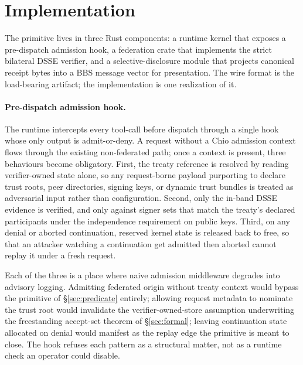 \section{Implementation}
\label{sec:implementation}

The primitive lives in three Rust components: a runtime kernel that exposes a pre-dispatch admission hook, a federation crate that implements the strict bilateral DSSE verifier, and a selective-disclosure module that projects canonical receipt bytes into a BBS message vector for presentation. The wire format is the load-bearing artifact; the implementation is one realization of it.

\paragraph{Pre-dispatch admission hook.} The runtime intercepts every tool-call before dispatch through a single hook whose only output is admit-or-deny. A request without a Chio admission context flows through the existing non-federated path; once a context is present, three behaviours become obligatory. First, the treaty reference is resolved by reading verifier-owned state alone, so any request-borne payload purporting to declare trust roots, peer directories, signing keys, or dynamic trust bundles is treated as adversarial input rather than configuration. Second, only the in-band DSSE evidence is verified, and only against signer sets that match the treaty's declared participants under the independence requirement on public keys. Third, on any denial or aborted continuation, reserved kernel state is released back to free, so that an attacker watching a continuation get admitted then aborted cannot replay it under a fresh request.

Each of the three is a place where naive admission middleware degrades into advisory logging. Admitting federated origin without treaty context would bypass the primitive of \S\ref{sec:predicate} entirely; allowing request metadata to nominate the trust root would invalidate the verifier-owned-store assumption underwriting the freestanding accept-set theorem of \S\ref{sec:formal}; leaving continuation state allocated on denial would manifest as the replay edge the primitive is meant to close. The hook refuses each pattern as a structural matter, not as a runtime check an operator could disable.

